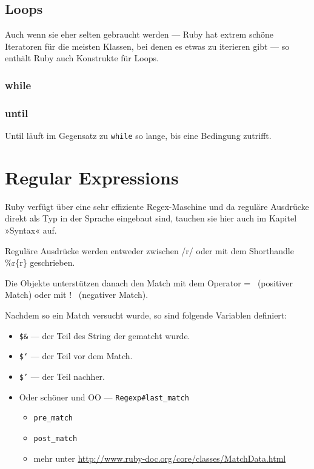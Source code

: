 \documentclass[a4book,11pt,twoside]{scrbook}
\begin{document}




\subsection*{Loops} %
\label{sub:loops}
Auch wenn sie eher selten gebraucht werden — Ruby hat extrem schöne Iteratoren für die meisten Klassen, bei denen es etwas zu iterieren gibt — so enthält Ruby auch Konstrukte für Loops.

\subsubsection*{while} %
\label{ssub:while}


\subsubsection{until} %
\label{ssub:until}
Until läuft im Gegensatz zu \texttt{while} so lange, bis eine Bedingung zutrifft.





\section{Regular Expressions} %
\label{sec:regular_expressions}
Ruby verfügt über eine sehr effiziente Regex-Maschine und da reguläre Ausdrücke direkt als Typ in der Sprache eingebaut sind, tauchen sie hier auch im Kapitel »Syntax« auf.

Reguläre Ausdrücke werden entweder zwischen /r/ oder mit dem Shorthandle \%r\{r\} geschrieben.



Die Objekte unterstützen danach den Match mit dem Operator =~ (positiver Match) oder mit !~ (negativer Match).

Nachdem so ein Match versucht wurde, so sind folgende Variablen definiert:

\begin{itemize}
	\item \texttt{\$\&} — der Teil des String der gematcht wurde.
	\item \texttt{\$`} — der Teil vor dem Match.
	\item \texttt{\$'} — der Teil nachher.
	\item Oder schöner und OO — \texttt{Regexp\#last\_match}
	\begin{itemize}
		\item \texttt{pre\_match}
		\item \texttt{post\_match}
		\item mehr unter \url{http://www.ruby-doc.org/core/classes/MatchData.html}
	\end{itemize}
\end{itemize}
\end{document}
